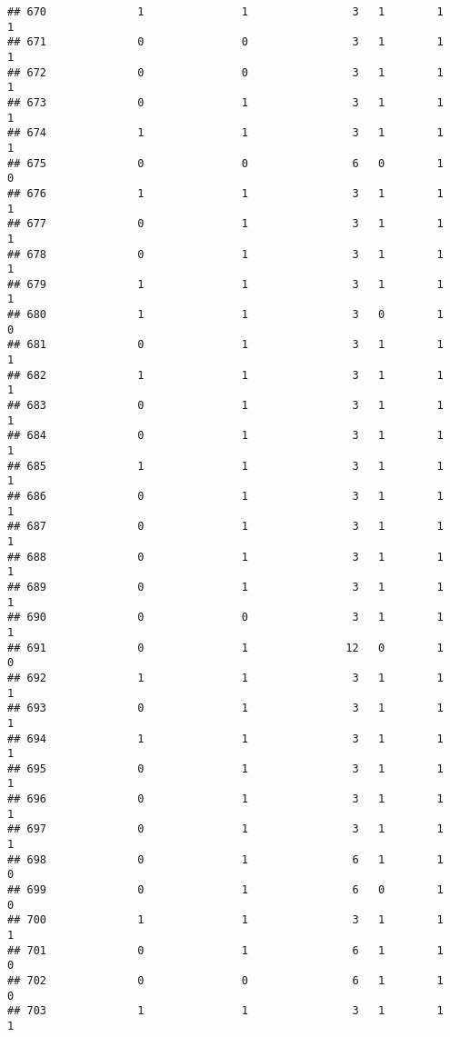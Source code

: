 \documentclass[]{article}
\begin{document}
\begin{verbatim}
## 670              1               1                3   1        1        1
## 671              0               0                3   1        1        1
## 672              0               0                3   1        1        1
## 673              0               1                3   1        1        1
## 674              1               1                3   1        1        1
## 675              0               0                6   0        1        0
## 676              1               1                3   1        1        1
## 677              0               1                3   1        1        1
## 678              0               1                3   1        1        1
## 679              1               1                3   1        1        1
## 680              1               1                3   0        1        0
## 681              0               1                3   1        1        1
## 682              1               1                3   1        1        1
## 683              0               1                3   1        1        1
## 684              0               1                3   1        1        1
## 685              1               1                3   1        1        1
## 686              0               1                3   1        1        1
## 687              0               1                3   1        1        1
## 688              0               1                3   1        1        1
## 689              0               1                3   1        1        1
## 690              0               0                3   1        1        1
## 691              0               1               12   0        1        0
## 692              1               1                3   1        1        1
## 693              0               1                3   1        1        1
## 694              1               1                3   1        1        1
## 695              0               1                3   1        1        1
## 696              0               1                3   1        1        1
## 697              0               1                3   1        1        1
## 698              0               1                6   1        1        0
## 699              0               1                6   0        1        0
## 700              1               1                3   1        1        1
## 701              0               1                6   1        1        0
## 702              0               0                6   1        1        0
## 703              1               1                3   1        1        1

\end{verbatim}
\end{document}
